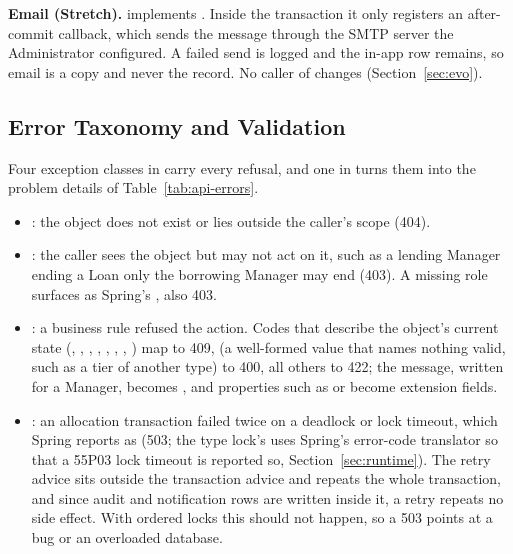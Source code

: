 \textbf{Email (Stretch).}  implements . Inside the transaction it only registers an after-commit callback, which sends the message through the SMTP server the Administrator configured. A failed send is logged and the in-app row remains, so email is a copy and never the record. No caller of  changes (Section~\ref{sec:evo}).

\subsection{Error Taxonomy and Validation}

Four exception classes in  carry every refusal, and one  in  turns them into the problem details of Table~\ref{tab:api-errors}.

\begin{itemize}
  \item {}: the object does not exist or lies outside the caller's scope (404).
  \item {}: the caller sees the object but may not act on it, such as a lending Manager ending a Loan only the borrowing Manager may end (403). A missing role surfaces as Spring's , also 403.
  \item {}: a business rule refused the action. Codes that describe the object's current state (, , , , , , , ) map to 409,  (a well-formed value that names nothing valid, such as a tier of another type) to 400, all others to 422; the message, written for a Manager, becomes , and properties such as  or  become extension fields.
  \item {}: an allocation transaction failed twice on a deadlock or lock timeout, which Spring reports as  (503; the type lock's  uses Spring's error-code translator so that a 55P03 lock timeout is reported so, Section~\ref{sec:runtime}). The retry advice sits outside the transaction advice and repeats the whole transaction, and since audit and notification rows are written inside it, a retry repeats no side effect. With ordered locks this should not happen, so a 503 points at a bug or an overloaded database.
\end{itemize}

